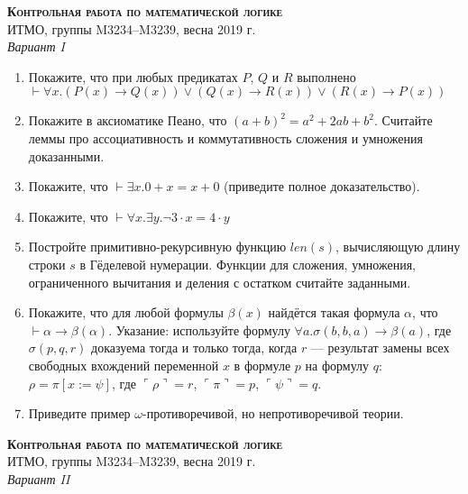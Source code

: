 \documentclass[11pt,a4paper,oneside]{scrartcl}
\begin{document}
\pagestyle{empty}

\begin{center}
{\large\scshape\bfseries Контрольная работа по математической логике}\\
ИТМО, группы M3234--M3239, весна 2019 г.\\
\itshape Вариант I
\end{center}


\begin{enumerate}
\item Покажите, что при любых предикатах $P$, $Q$ и $R$ выполнено
$\vdash \forall x.(P(x)\rightarrow Q(x))\vee(Q(x)\rightarrow R(x))\vee(R(x)\rightarrow P(x))$ 
\item Покажите в аксиоматике Пеано, что $(a+b)^2 = a^2 + 2ab +b^2$. Считайте леммы про ассоциативность и коммутативность
сложения и умножения доказанными.
\item Покажите, что $\vdash \exists x.0+x=x+0$ (приведите полное доказательство).
\item Покажите, что $\vdash \forall x.\exists y.\neg 3\cdot x = 4\cdot y$ 
\item Постройте примитивно-рекурсивную функцию $len(s)$, вычисляющую длину строки $s$ в Гёделевой нумерации.
Функции для сложения, умножения, ограниченного вычитания и деления с остатком считайте заданными.
\item Покажите, что для любой формулы $\beta(x)$ найдётся такая формула $\alpha$, 
что $\vdash\alpha\rightarrow\beta(\alpha)$. Указание: используйте формулу $\forall a.\sigma(b,b,a)\rightarrow\beta(a)$,
где $\sigma(p,q,r)$ доказуема тогда и только тогда, когда $r$ --- результат замены всех свободных
вхождений переменной $x$ в формуле $p$ на формулу $q$: $\rho = \pi[x := \psi]$, где
$\ulcorner\rho\urcorner = r$, $\ulcorner\pi\urcorner = p$, $\ulcorner\psi\urcorner = q$.
\item Приведите пример $\omega$-противоречивой, но непротиворечивой теории.
\end{enumerate}

\vspace{3cm}
\begin{center}
{\large\scshape\bfseries Контрольная работа по математической логике}\\
ИТМО, группы M3234--M3239, весна 2019 г.\\
\itshape Вариант II
\end{center}
\end{document}
